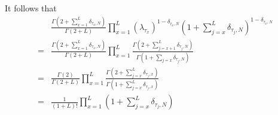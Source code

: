\documentclass[10pt]{article}
\numberwithin{equation}{section}
\numberwithin{equation}{subsection}
\begin{document}
\begin{comment}
{\color{blue}
\begin{equation}
\begin{split}
\Psi^{''}(\tau_1,\ldots,\tau_L)&=\left[\prod_{x=1}^{L}\lambda_{\tau_{x}}^{(1-\delta_{\tau_{x},N})}\right] \frac{\Gamma\left(2+L-\sum_{x=1}^{L}(1-\delta_{\tau_{x},N})\right)}{\Gamma\left(2+L\right)}\prod_{x=1}^{L} \frac{\Gamma\left(2+L-x-\sum_{j=x+1}^{L}(1-\delta_{\tau_{j},N})\right)}{\Gamma\left(2+L-x-\sum_{j=x}^{L}(1-\delta_{\tau_{j},N})\right)}\\
&=\left[\prod_{x=1}^{L}\lambda_{\tau_{x}}^{(1-\delta_{\tau_{x},N})}\right] \frac{\Gamma\left(2 \right)}{\Gamma\left(2+L\right)}\prod_{x=1}^{L} \frac{\Gamma\left(3+L-x-\sum_{j=x}^{L}(1-\delta_{\tau_{j},N})\right)}{\Gamma\left(2+L-x-\sum_{j=x}^{L}(1-\delta_{\tau_{j},N})\right)}\\
&=\left[\prod_{x=1}^{L}\lambda_{\tau_{x}}^{(1-\delta_{\tau_{x},N})}\right] \frac{\Gamma\left(2 \right)}{\Gamma\left(2+L\right)}\prod_{x=1}^{L} \frac{\Gamma\left(2+\sum_{j=x}^{L}\delta_{\tau_{j},N}\right)}{\Gamma\left(1+\sum_{j=x}^{L}\delta_{\tau_{j},N}\right)}\\
&=  \frac{1}{\left(1+L\right)!}\prod_{x=1}^{L} \lambda_{\tau_{x}}^{(1-\delta_{\tau_{x},N})}\left(1+\sum_{j=x}^{L}\delta_{\tau_{j},N}\right)
\end{split}
\end{equation}}
\end{comment}
It follows that 
\begin{align}\label{remove-exponent}
&\frac{\Gamma(2+\sum_{x=1}^{L}\delta_{\tau_{x},N})}{\Gamma(2+L)}\prod_{x=1}^{L}\left(\lambda_{\tau_{x}}\right)^{1-\delta_{\tau_{x},N}}\left(1+\sum_{j=x}^{L}\delta_{\tau_{j},N}\right)^{1-\delta_{\tau_{x},N}}\nonumber\\
=&\frac{\Gamma(2+\sum_{x=1}^{L}\delta_{\tau_{x},N})}{\Gamma(2+L)}\prod_{x=1}^{L}\frac{\Gamma(2+\sum_{j=x+1}^{L}\delta_{\tau_{j},N})}{\Gamma(1+\sum_{j=x}\delta_{\tau_{j},N})}\nonumber\\
=&\frac{\Gamma(2)}{\Gamma(2+L)}\prod_{x=1}^{L}\frac{\Gamma(2+\sum_{j=x}^{L}\delta_{\tau_{j},x})}{\Gamma(1+\sum_{j=x}^{L}\delta_{\tau_{j},x})}\nonumber\\
=&\frac{1}{(1+L)!}\prod_{x=1}^{L}\left(1+\sum_{j=x}^{L}\delta_{\tau_{j},N}\right)
\end{align}
\end{document}
